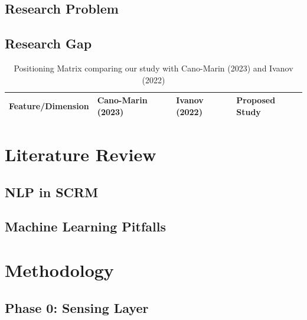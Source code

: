\documentclass[10pt, conference, letterpaper]{IEEEtran}
\begin{document}
\subsection{Research Problem}

\subsection{Research Gap}

\begin{table}[!t]
\centering
\caption{Positioning Matrix comparing our study with Cano-Marin (2023) and Ivanov (2022)}
\label{tab:positioning}
\begin{tabular}{@{}llll@{}}
\toprule
\textbf{Feature/Dimension} & \textbf{Cano-Marin (2023)} & \textbf{Ivanov (2022)} & \textbf{Proposed Study} \\ \midrule
\bottomrule
\end{tabular}
\end{table}

\section{Literature Review}

\subsection{NLP in SCRM}

\subsection{Machine Learning Pitfalls}

\section{Methodology}

\subsection{Phase 0: Sensing Layer}
\end{document}
